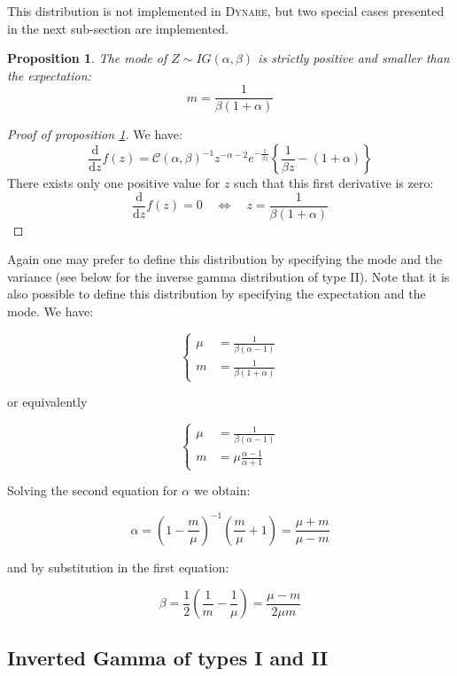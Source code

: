 \documentclass{amsart}
\theoremstyle{plain}
\newtheorem{proposition}{Proposition}[section]
\theoremstyle{remark}
\numberwithin{equation}{section}
\newcommand{\Dynare}{\textsc{Dynare}}
\begin{document}
This distribution is not implemented in \Dynare, but two special cases presented in the next sub-section are implemented.\newline

\begin{proposition}\label{InvertedGammaMode}
  The mode of $Z\sim IG(\alpha,\beta)$ is strictly positive and smaller than the expectation:
  \[
    m = \frac{1}{\beta(1+\alpha)}
  \]
\end{proposition}

\begin{proof}[Proof of proposition \ref{InvertedGammaMode}]
  We have:
  \[
    \frac{\mathrm d}{\mathrm dz}f(z) = \mathcal C(\alpha,\beta)^{-1}z^{-\alpha-2}e^{-\frac{1}{\beta z}}\left\{\frac{1}{\beta z}-(1+\alpha)\right\}
  \]
  There exists only one positive value for $z$ such that this first derivative is zero:
  \[
    \frac{\mathrm d}{\mathrm dz}f(z) = 0 \quad \Leftrightarrow \quad z = \frac{1}{\beta(1+\alpha)}
  \]
\end{proof}

Again one may prefer to define this distribution by specifying the mode and the
variance (see below for the inverse gamma distribution of type II). Note that it is also
possible to define this distribution by specifying the expectation and the mode. We have:

\[
  \begin{cases}
    \mu &= \frac{1}{\beta(\alpha-1)}\\
    m &= \frac{1}{\beta(1+\alpha)}
  \end{cases}
\]

or equivalently

\[
  \begin{cases}
    \mu &= \frac{1}{\beta(\alpha-1)}\\
    m &= \mu\frac{\alpha-1}{\alpha+1}
  \end{cases}
\]

Solving the second equation for $\alpha$ we obtain:

\[
\alpha = \left(1-\frac{m}{\mu}\right)^{-1}\left(\frac{m}{\mu}+1\right) = \frac{\mu+m}{\mu-m}
\]

and by substitution in the first equation:

\[
\beta = \frac{1}{2}\left(\frac{1}{m}-\frac{1}{\mu}\right) = \frac{\mu-m}{2\mu m}
\]

\subsection{Inverted Gamma of types I and II}\label{sec:InvertedGammaDistributionsOfType1And2}
\end{document}
